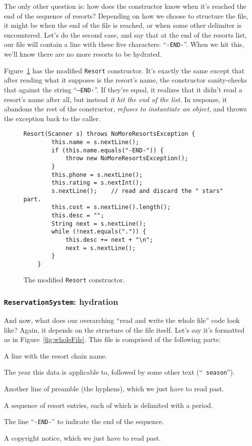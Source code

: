 The only other question is: how does the constructor know when it's reached
the end of the sequence of resorts? Depending on how we choose to structure
the file, it might be when the end of the file is reached, or when some other
delimiter is encountered. Let's do the second case, and say that at the end of
the resorts list, our file will contain a line with these five characters:
``\texttt{-END-}''. When we hit this, we'll know there are no more resorts to be
hydrated.

Figure~\ref{fig:modifiedResort} has the modified \texttt{Resort} constructor.
It's exactly the same except that after reading what it supposes is the
resort's name, the constructor sanity-checks that against the string
``\texttt{--END-}''. If they're equal, it realizes that it didn't read a
resort's name after all, but instead \textit{it hit the end of the list.} In
response, it abandons the rest of the constructor, \textit{refuses to
instantiate an object}, and throws the exception back to the caller.


\begin{figure}[ht]
\centering
\begin{Verbatim}[fontsize=\footnotesize,samepage=true,frame=single]
    Resort(Scanner s) throws NoMoreResortsException {
        this.name = s.nextLine();
        if (this.name.equals("-END-")) {
            throw new NoMoreResortsException();
        }
        this.phone = s.nextLine();
        this.rating = s.nextInt();
        s.nextLine();    // read and discard the " stars" part.
        this.cost = s.nextLine().length();
        this.desc = "";
        String next = s.nextLine();
        while (!next.equals(".")) {
            this.desc += next + "\n";
            next = s.nextLine();
        }
    }
\end{Verbatim}
\caption{The modified \texttt{Resort} constructor.}
\label{fig:modifiedResort}
\end{figure}

\subsubsection{\texttt{ReservationSystem}: hydration}

And now, what does our overarching ``read and write the whole file'' code look
like? Again, it depends on the structure of the file itself. Let's say it's
formatted as in Figure~\ref{fig:wholeFile}. This file is comprised of the
following parts:

\begin{compactenum}
\item A line with the resort chain name.
\item The year this data is applicable to, followed by some other text
(``\texttt{ season}'').
\item Another line of preamble (the hyphens), which we just have to read
past.
\item A sequence of resort entries, each of which is delimited with a period.
\item The line ``\texttt{-END-}'' to indicate the end of the sequence.
\item A copyright notice, which we just have to read past.
\end{compactenum}


